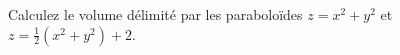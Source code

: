 
\begin{exercice}\label{exoIntMult0008}

Calculez le volume délimité par les paraboloïdes $z=x^2+y^2$ et $z=\frac{1}{2}(x^2+y^2)+2$.

\end{exercice}
